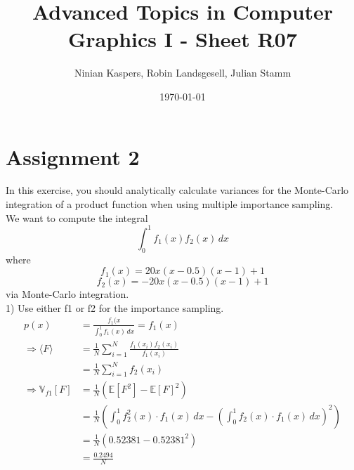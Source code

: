 \documentclass{article}
\title{Advanced Topics in Computer Graphics I - Sheet R07}
\author{Ninian Kaspers, Robin Landsgesell, Julian Stamm}
\date{\today}
\begin{document}
    \maketitle

    \section*{Assignment 2}

    In this exercise, you should analytically calculate variances for the Monte-Carlo integration of a product function when using multiple importance sampling. \\
    We want to compute the integral  \\
    \[ \int_{0}^{1} f_1(x)f_2(x)\,dx \]
    where
    \[f_1(x) = 20x(x - 0.5)(x - 1) + 1\]
    \[f_2(x) = -20x(x - 0.5)(x - 1) + 1\]
    via Monte-Carlo integration. \\
    1) Use either f1 or f2 for the importance sampling. \\
    \begin{align*}
        p(x) &= \frac{f_1(x}{\int_{0}^{1} f_1(x)\, dx} = f_1(x) \\
        \Rightarrow \langle F \rangle &= \frac{1}{N} \sum_{i=1}^{N} \frac{f_1(x_i)f_2(x_i)}{f_1(x_i)} \\
        &= \frac{1}{N} \sum_{i=1}^{N} f_2(x_i) \\
        \Rightarrow \mathbb{V}_{f1}[F] &= \frac{1}{N} (\mathbb{E}[F^2] - \mathbb{E}[F]^2) \\
        &= \frac{1}{N} \left( \int_{0}^{1} f_2^2(x) \cdot f_1(x) \, dx - \left( \int_{0}^{1} f_2(x) \cdot f_1(x) \, dx \right)^2 \right) \\
        &= \frac{1}{N} \left( 0.52381 - 0.52381^2 \right) \\
        &= \frac{0.2494}{N}
    \end{align*}
\end{document}
